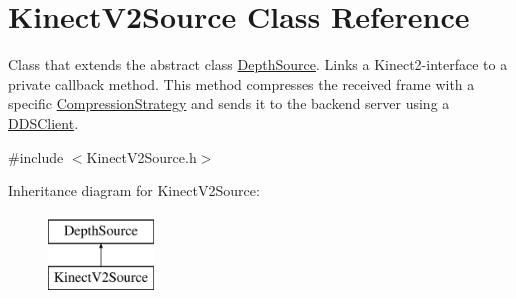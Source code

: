 \hypertarget{class_kinect_v2_source}{\section{Kinect\+V2\+Source Class Reference}
\label{class_kinect_v2_source}
}


Class that extends the abstract class \hyperlink{class_depth_source}{Depth\+Source}. Links a Kinect2-\/interface to a private callback method. This method compresses the received frame with a specific \hyperlink{class_compression_strategy}{Compression\+Strategy} and sends it to the backend server using a \hyperlink{class_d_d_s_client}{D\+D\+S\+Client}.  




{\ttfamily \#include $<$Kinect\+V2\+Source.\+h$>$}

Inheritance diagram for Kinect\+V2\+Source\+:\begin{figure}[H]
\begin{center}
\leavevmode
\includegraphics[height=2.000000cm]{class_kinect_v2_source}
\end{center}
\end{figure}
